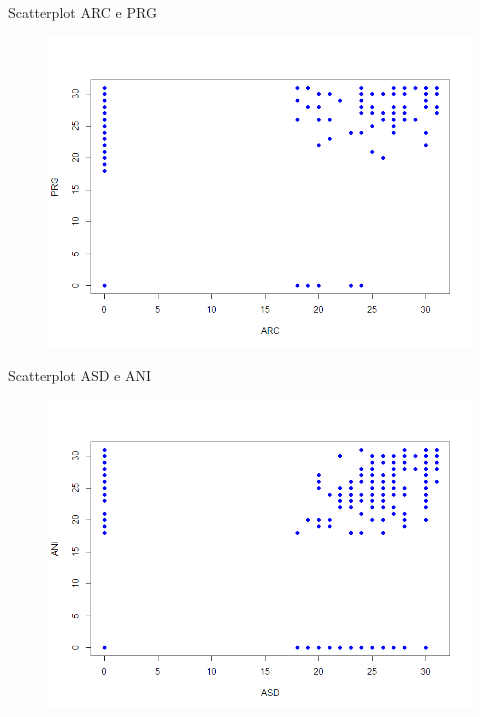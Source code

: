 \documentclass{beamer}
\begin{document}
  \begin{frame}{Scatterplot ARC e PRG}
    \begin{figure}[bt]
      \begin{center}
        \includegraphics[width=\textwidth]{../img/arcPrg.png}
      \end{center}
    \end{figure}
  \end{frame}

  \begin{frame}{Scatterplot ASD e ANI}
    \begin{figure}[bt]
      \begin{center}
        \includegraphics[width=\textwidth]{../img/asdAni.png}
      \end{center}
    \end{figure}
  \end{frame}
\end{document}
